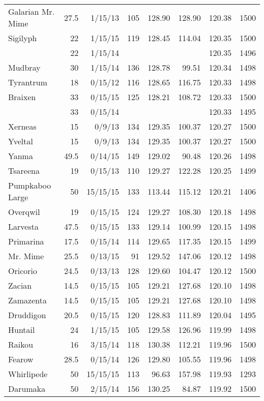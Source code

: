 \begin{longtable}{lrrrrrrr}
Galarian Mr. Mime & 27.5 & 1/15/13 & 105 & 128.90 & 128.90 & 120.38 & 1500\\
Sigilyph & 22 & 1/15/15 & 119 & 128.45 & 114.04 & 120.35 & 1500\\
 & 22 & 1/15/14 & & & & 120.35 & 1496\\
Mudbray & 30 & 1/15/14 & 136 & 128.78 & 99.51 & 120.34 & 1498\\
Tyrantrum & 18 & 0/15/12 & 116 & 128.65 & 116.75 & 120.33 & 1498\\
Braixen & 33 & 0/15/15 & 125 & 128.21 & 108.72 & 120.33 & 1500\\
 & 33 & 0/15/14 & & & & 120.33 & 1495\\
Xerneas & 15 & 0/9/13 & 134 & 129.35 & 100.37 & 120.27 & 1500\\
Yveltal & 15 & 0/9/13 & 134 & 129.35 & 100.37 & 120.27 & 1500\\
Yanma & 49.5 & 0/14/15 & 149 & 129.02 & 90.48 & 120.26 & 1498\\
Tsareena & 19 & 0/15/13 & 110 & 129.27 & 122.28 & 120.25 & 1499\\
Pumpkaboo Large & 50 & 15/15/15 & 133 & 113.44 & 115.12 & 120.21 & 1406\\
Overqwil & 19 & 0/15/15 & 124 & 129.27 & 108.30 & 120.18 & 1498\\
Larvesta & 47.5 & 0/15/15 & 133 & 129.14 & 100.99 & 120.15 & 1498\\
Primarina & 17.5 & 0/15/14 & 114 & 129.65 & 117.35 & 120.15 & 1499\\
Mr. Mime & 25.5 & 0/13/15 & 91 & 129.52 & 147.06 & 120.12 & 1498\\
Oricorio & 24.5 & 0/13/13 & 128 & 129.60 & 104.47 & 120.12 & 1500\\
Zacian & 14.5 & 0/15/15 & 105 & 129.21 & 127.68 & 120.10 & 1498\\
Zamazenta & 14.5 & 0/15/15 & 105 & 129.21 & 127.68 & 120.10 & 1498\\
Druddigon & 20.5 & 0/15/15 & 120 & 128.83 & 111.89 & 120.04 & 1495\\
Huntail & 24 & 1/15/15 & 105 & 129.58 & 126.96 & 119.99 & 1498\\
Raikou & 16 & 3/15/14 & 118 & 130.38 & 112.21 & 119.96 & 1500\\
Fearow & 28.5 & 0/15/14 & 126 & 129.80 & 105.55 & 119.96 & 1498\\
Whirlipede & 50 & 15/15/15 & 113 & 96.63 & 157.98 & 119.93 & 1293\\
Darumaka & 50 & 2/15/14 & 156 & 130.25 & 84.87 & 119.92 & 1500\\

\end{longtable}
